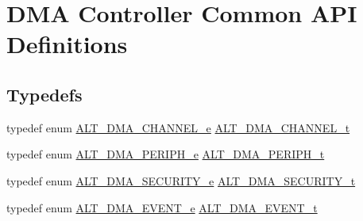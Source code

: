 \hypertarget{group__ALT__DMA__COMMON}{}\section{D\+MA Controller Common A\+PI Definitions}
\label{group__ALT__DMA__COMMON}
\subsection*{Typedefs}
\begin{DoxyCompactItemize}
\item 
typedef enum \mbox{\hyperlink{group__ALT__DMA__COMMON_ga16053f2a9f79090b801843859458a156}{A\+L\+T\+\_\+\+D\+M\+A\+\_\+\+C\+H\+A\+N\+N\+E\+L\+\_\+e}} \mbox{\hyperlink{group__ALT__DMA__COMMON_ga959232e3b00ce45a3049183cce4c9d59}{A\+L\+T\+\_\+\+D\+M\+A\+\_\+\+C\+H\+A\+N\+N\+E\+L\+\_\+t}}
\item 
typedef enum \mbox{\hyperlink{group__ALT__DMA__COMMON_gad28f2571875df0110325be013606240c}{A\+L\+T\+\_\+\+D\+M\+A\+\_\+\+P\+E\+R\+I\+P\+H\+\_\+e}} \mbox{\hyperlink{group__ALT__DMA__COMMON_gae9baf8ac891f0583f9c1c61528cc1736}{A\+L\+T\+\_\+\+D\+M\+A\+\_\+\+P\+E\+R\+I\+P\+H\+\_\+t}}
\item 
typedef enum \mbox{\hyperlink{group__ALT__DMA__COMMON_ga13d7349f2971e04c8cff4a6c53a19fd8}{A\+L\+T\+\_\+\+D\+M\+A\+\_\+\+S\+E\+C\+U\+R\+I\+T\+Y\+\_\+e}} \mbox{\hyperlink{group__ALT__DMA__COMMON_ga59d720d9a72123eca037cc48a734fd7c}{A\+L\+T\+\_\+\+D\+M\+A\+\_\+\+S\+E\+C\+U\+R\+I\+T\+Y\+\_\+t}}
\item 
typedef enum \mbox{\hyperlink{group__ALT__DMA__COMMON_ga096b104b3be2d1242a1c427cbe4e8cb0}{A\+L\+T\+\_\+\+D\+M\+A\+\_\+\+E\+V\+E\+N\+T\+\_\+e}} \mbox{\hyperlink{group__ALT__DMA__COMMON_gad02f1735ad41b201414e8d032e0f9426}{A\+L\+T\+\_\+\+D\+M\+A\+\_\+\+E\+V\+E\+N\+T\+\_\+t}}
\end{DoxyCompactItemize}
